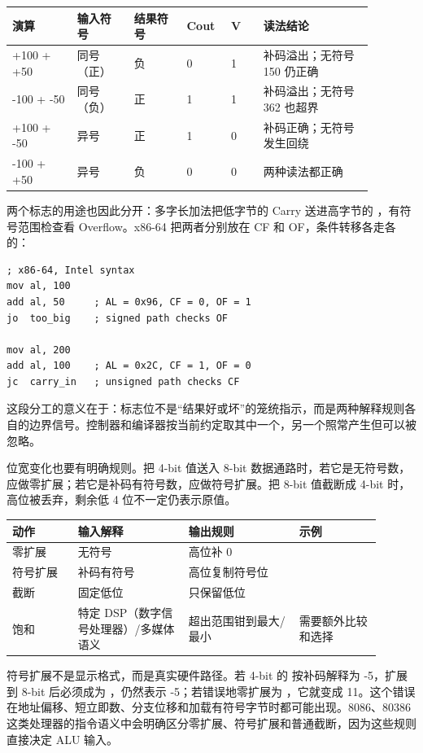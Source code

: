 \begin{longtable}{L{0.16\linewidth}L{0.14\linewidth}L{0.13\linewidth}L{0.1\linewidth}L{0.08\linewidth}L{0.27\linewidth}}
\toprule
演算 & 输入符号 & 结果符号 & Cout & V & 读法结论 \\
\midrule
+100 + +50 & 同号（正） & 负 & 0 & 1 & 补码溢出；无符号 150 仍正确 \\
-100 + -50 & 同号（负） & 正 & 1 & 1 & 补码溢出；无符号 362 也超界 \\
+100 + -50 & 异号 & 正 & 1 & 0 & 补码正确；无符号发生回绕 \\
-100 + +50 & 异号 & 负 & 0 & 0 & 两种读法都正确 \\
\bottomrule
\end{longtable}

两个标志的用途也因此分开：多字长加法把低字节的 Carry 送进高字节的 ，有符号范围检查看 Overflow。x86-64 把两者分别放在 CF 和 OF，条件转移各走各的：

\begin{lstlisting}
; x86-64, Intel syntax
mov al, 100
add al, 50     ; AL = 0x96, CF = 0, OF = 1
jo  too_big    ; signed path checks OF

mov al, 200
add al, 100    ; AL = 0x2C, CF = 1, OF = 0
jc  carry_in   ; unsigned path checks CF
\end{lstlisting}

这段分工的意义在于：标志位不是“结果好或坏”的笼统指示，而是两种解释规则各自的边界信号。控制器和编译器按当前约定取其中一个，另一个照常产生但可以被忽略。

位宽变化也要有明确规则。把 4-bit 值送入 8-bit 数据通路时，若它是无符号数，应做零扩展；若它是补码有符号数，应做符号扩展。把 8-bit 值截断成 4-bit 时，高位被丢弃，剩余低 4 位不一定仍表示原值。

\begin{longtable}{L{0.16\linewidth}L{0.27\linewidth}L{0.27\linewidth}L{0.2\linewidth}}
\toprule
动作 & 输入解释 & 输出规则 & 示例 \\
\midrule
零扩展 & 无符号 & 高位补 0 &  \\
符号扩展 & 补码有符号 & 高位复制符号位 &  \\
截断 & 固定低位 & 只保留低位 &  \\
饱和 & 特定 DSP（数字信号处理器）/多媒体语义 & 超出范围钳到最大/最小 & 需要额外比较和选择 \\
\bottomrule
\end{longtable}

符号扩展不是显示格式，而是真实硬件路径。若 4-bit 的  按补码解释为 -5，扩展到 8-bit 后必须成为 ，仍然表示 -5；若错误地零扩展为 ，它就变成 11。这个错误在地址偏移、短立即数、分支位移和加载有符号字节时都可能出现。8086、80386 这类处理器的指令语义中会明确区分零扩展、符号扩展和普通截断，因为这些规则直接决定 ALU 输入。

